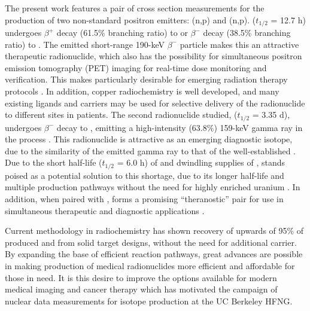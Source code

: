 \documentclass[5p]{elsarticle}
\newcommand{\comment}[1]{\todo[color=blue!20!white,inline]{ASV: #1}}
\begin{document}
The present work features a pair of cross section measurements for the production of two non-standard positron emitters: (n,p) and (n,p).
  ($t_{1/2}$ = 12.7 h) undergoes $\beta^+$ decay (61.5\% branching ratio) to  or $\beta^-$ decay (38.5\% branching ratio) to  \cite{Singh2007}.
The emitted short-range 190-keV $\beta^-$ particle makes this an  attractive  therapeutic radionuclide, which also has the possibility for simultaneous positron emission tomography (PET) imaging for real-time dose monitoring and verification.
This makes  particularly desirable  for emerging radiation therapy protocols \cite{Lewis2003,NSACIsotopesSubcommittee2015,Bandari2014,mp500671j}.
In addition, copper radiochemistry is well developed, and many existing ligands and carriers may be used for selective delivery of the radionuclide to different sites in patients.
The second radionuclide studied,  ($t_{1/2}$ = 3.35 d), undergoes $\beta^-$ decay to , emitting a high-intensity (63.8\%) 159-keV gamma ray in the process \cite{Burrows2007}.
This radionuclide is  attractive as an emerging diagnostic isotope, due to the similarity of the emitted gamma ray to that of the  well-established  \cite{Qaim2011,Qaim201731,Kolsky1998,mausner1995evaluation}.
Due to the short half-life ($t_{1/2}$ = 6.0 h) of and dwindling supplies of ,  stands poised as a potential solution to this shortage, due to its longer half-life and multiple production pathways without the need for highly enriched uranium \cite{Browne2011}.
In addition, when paired with ,  forms a promising \enquote{theranostic} pair for use in simultaneous therapeutic and diagnostic applications \cite{Muller2014,Deilami-nezhad2016}.




Current methodology in radiochemistry has shown recovery of upwards of 95\% of produced  \cite{bhatki1969preparation,mirzadeh1992spontaneous} and  \cite{Aly1971,Bokhari2010,BF02047448} from solid target designs, without the need for additional carrier.
By expanding the base of efficient reaction pathways, great advances are possible in making production of medical radionuclides more efficient and affordable for those in need.  It is this desire to improve the options available for modern medical imaging and cancer therapy which has motivated the campaign of nuclear data measurements for isotope production at the UC Berkeley HFNG.
\end{document}
